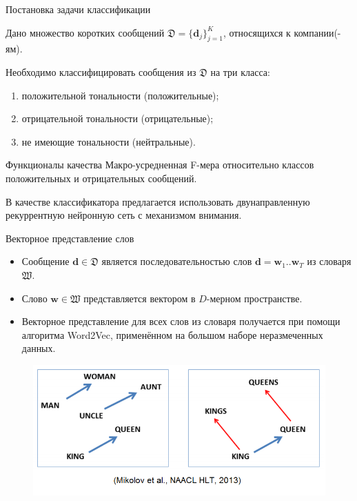 \documentclass{beamer}
\begin{document}
\begin{frame}{Постановка задачи классификации}
	\begin{block}{}
        Дано множество коротких сообщений $\mathfrak{D} = \{\mathbf{d}_j\}_{j=1}^{K}$, относящихся к компании(-ям).
	\end{block}    
    
    \begin{block}{}
        Необходимо классифицировать сообщения из $\mathfrak{D}$ на три класса:
        	\begin{enumerate}
			\item положительной тональности (положительные);
			\item отрицательной тональности (отрицательные);
			\item не имеющие тональности (нейтральные).
			\end{enumerate}
	\end{block}
	
	\begin{block}{Функционалы качества}
		Макро-усредненная F-мера
относительно классов положительных и
отрицательных сообщений.
	\end{block}
	В качестве классификатора предлагается использовать двунаправленную рекуррентную нейронную сеть с механизмом внимания.
\end{frame}
\begin{frame}{Векторное представление слов}
	\begin{itemize}
	\item Сообщение $\mathbf{d}\in\mathfrak{D}$ является последовательностью слов $\mathbf{d}=\mathbf{w}_1..\mathbf{w}_T$ из словаря $\mathfrak{W}$.\\
	\item Слово $\mathbf{w}\in\mathfrak{W}$ представляется вектором в $D$-мерном пространстве.\\
	\item Векторное представление для всех слов из словаря получается при помощи алгоритма Word2Vec, применённом на большом наборе неразмеченных данных.
	\end{itemize}
\begin{figure}[!h]
  \includegraphics[width=1.0\textwidth]{images/word2vec.png}
\end{figure}
\end{frame}
\end{document}
